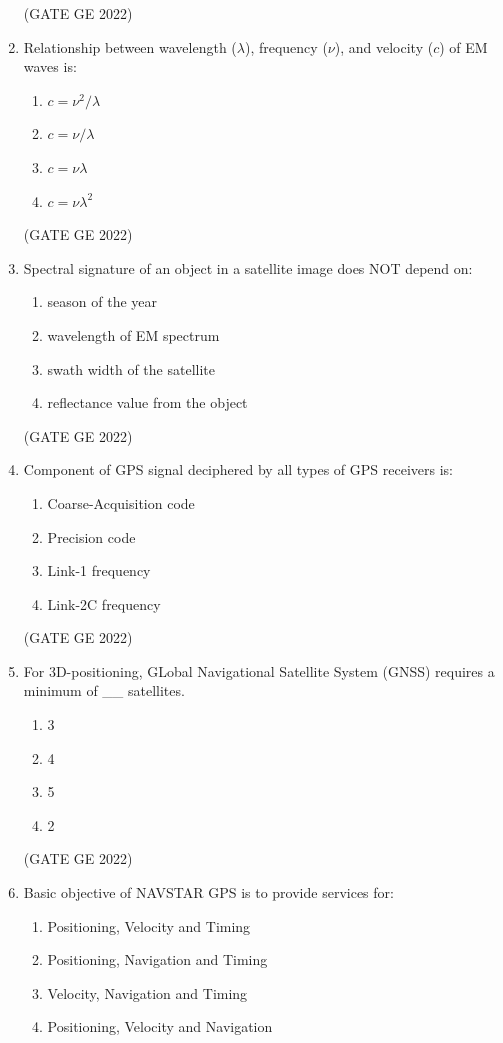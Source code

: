 \documentclass[a4paper, 11pt]{article}
\begin{document}
\begin{enumerate}
\hfill (GATE GE 2022)

\item Relationship between wavelength ($\lambda$), frequency ($\nu$), and velocity ($c$) of EM waves is:
\begin{enumerate}
    \item $c = \nu^2 / \lambda$
    \item $c = \nu / \lambda$
    \item $c = \nu \lambda$
    \item $c = \nu \lambda^2$
\end{enumerate}

\hfill (GATE GE 2022)

\item Spectral signature of an object in a satellite image does NOT depend on:
\begin{enumerate}
    \item season of the year
    \item wavelength of EM spectrum
    \item swath width of the satellite
    \item reflectance value from the object
\end{enumerate}

\hfill (GATE GE 2022)

\item Component of GPS signal deciphered by all types of GPS receivers is:
\begin{enumerate}
    \item Coarse-Acquisition code
    \item Precision code
    \item Link-1 frequency
    \item Link-2C frequency
\end{enumerate}

\hfill (GATE GE 2022)

\item For 3D-positioning, GLobal Navigational Satellite System (GNSS) requires a minimum of \_\_ satellites.
\begin{enumerate}
    \item 3
    \item 4
    \item 5
    \item 2
\end{enumerate}

\hfill (GATE GE 2022)

\item Basic objective of NAVSTAR GPS is to provide services for:
\begin{enumerate}
    \item Positioning, Velocity and Timing
    \item Positioning, Navigation and Timing
    \item Velocity, Navigation and Timing
    \item Positioning, Velocity and Navigation
\end{enumerate}


\end{enumerate}
\end{document}
